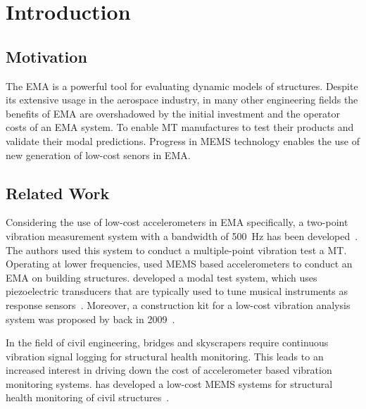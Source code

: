 \setcounter{chapter}{0}

\chapter{Introduction}

\section{Motivation}
The \ac{EMA} is a powerful tool for evaluating dynamic models of structures. Despite its extensive usage in the aerospace industry, in many other engineering fields the benefits of \ac{EMA} are overshadowed by the initial investment and the operator costs of an \ac{EMA} system. To enable \ac{MT} manufactures to test their products and validate their modal predictions. Progress in \ac{MEMS} technology enables the use of new generation of low-cost senors in \ac{EMA}.

\section{Related Work}

Considering the use of low-cost accelerometers in \ac{EMA} specifically, a two-point vibration measurement system with a bandwidth of \SI{500}{\hertz} has been developed~\cite{chan2017multiple}. The authors \citeauthor{chan2017multiple} used this system to conduct a multiple-point vibration test a \ac{MT}. Operating at lower frequencies, \citeauthor{beskhyroun2012low} used \ac{MEMS} based accelerometers to conduct an \ac{EMA} on building structures. \citeauthor{piana2016experimental} developed a modal test system, which uses piezoelectric transducers that are typically used to tune musical instruments as response sensors~\cite{piana2016experimental}. Moreover, a construction kit for a low-cost vibration analysis system was proposed by \citeauthor{vollmer2009construction} back in 2009~\cite{vollmer2009construction}.

In the field of civil engineering, bridges and skyscrapers require continuous vibration signal logging for structural health monitoring. This leads to an increased interest in driving down the cost of accelerometer based vibration monitoring systems. \citeauthor{girolami2018modal} has developed a low-cost \ac{MEMS} systems for structural health monitoring of civil structures~\cite{girolami2018modal}.


